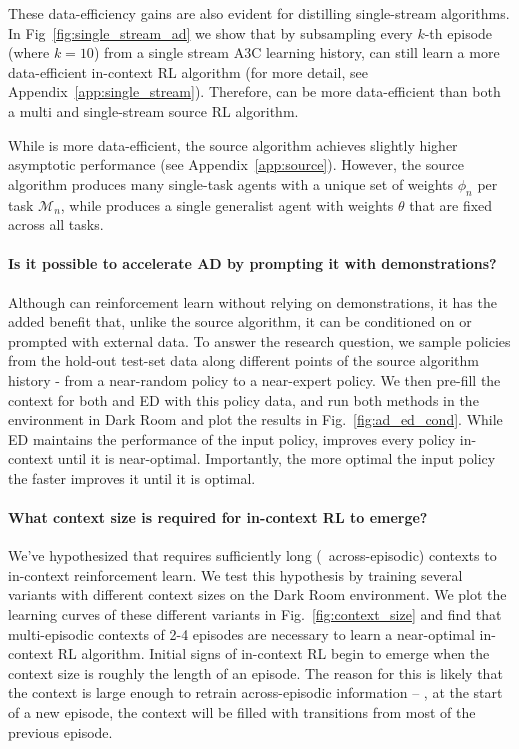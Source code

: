 These data-efficiency gains are also evident for distilling single-stream algorithms.
In Fig~\ref{fig:single_stream_ad} we show that by subsampling every $k$-th episode (where $k=10$) from a single stream A3C learning history, \name can still learn a more data-efficient in-context RL algorithm (for more detail, see Appendix~\ref{app:single_stream}). Therefore, \name can be more data-efficient than both a multi and single-stream source RL algorithm.

While \name is more data-efficient, the source algorithm achieves slightly higher asymptotic performance (see Appendix~\ref{app:source}). However, the source algorithm produces many single-task agents with a unique set of weights $\phi_n$ per task $\mathcal M_n$, while \name produces a single generalist agent with weights $\theta$ that are fixed across all tasks.


\vspace{-2mm}
\paragraph{Is it possible to accelerate AD by prompting it with demonstrations?}


Although \name can reinforcement learn without relying on demonstrations, it has the added benefit that, unlike the source algorithm, it can be conditioned on or prompted with external data.
To answer the research question, we sample policies from the hold-out test-set data along different points of the source algorithm history - from a near-random policy to a near-expert policy. We then pre-fill the context for both \name and ED with this policy data, and run both methods in the environment in Dark Room  and plot the results in Fig.~\ref{fig:ad_ed_cond}.
While ED maintains the performance of the input policy, \name improves every policy in-context until it is near-optimal. Importantly, the more optimal the input policy the faster \name improves it until it is optimal.






\vspace{-2mm}

\paragraph{What context size is required for in-context RL to emerge?}
We've hypothesized that \name requires sufficiently long (\ie \ across-episodic) contexts to in-context reinforcement learn. We test this hypothesis by training several \name variants with different context sizes on the Dark Room environment. We plot the learning curves of these different variants in Fig.~\ref{fig:context_size} and find that multi-episodic contexts of 2-4 episodes are necessary to learn a near-optimal in-context RL algorithm. Initial signs of in-context RL begin to emerge when the context size is roughly the length of an episode. The reason for this is likely that the context is large enough to retrain across-episodic information -- \eg, at the start of a new episode, the context will be filled with transitions from most of the previous episode.

